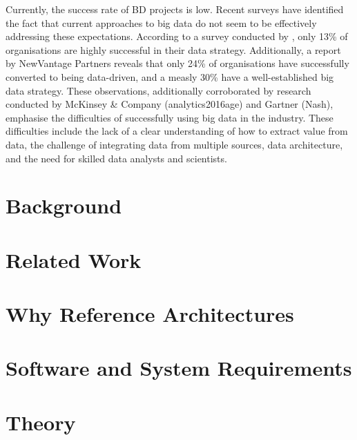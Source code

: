 \documentclass[preprint,12pt]{elsarticle}
\begin{document}
Currently, the success rate of BD projects is low. Recent surveys have identified the fact that current approaches to big data do not seem to be effectively addressing these expectations. According to a survey conducted by \citeauthor{DataBricksSurvey}, only 13\% of organisations are highly successful in their data strategy. Additionally, a report by NewVantage Partners reveals that only 24\% of organisations have successfully converted to being data-driven, and a measly 30\% have a well-established big data strategy. These observations, additionally corroborated by research conducted by McKinsey & Company (analytics2016age) and Gartner (Nash), emphasise the difficulties of successfully using big data in the industry. These difficulties include the lack of a clear understanding of how to extract value from data, the challenge of integrating data from multiple sources, data architecture, and the need for skilled data analysts and scientists. 

\section{Background}
\label{sec:background}

\section{Related Work}
\label{sec:related_work}

\section{Why Reference Architectures}
\label{sec:why_reference_architectures}

\section{Software and System Requirements}
\label{sec:software_and_system_requirements}

\section{Theory}
\label{sec:theory}
\end{document}
